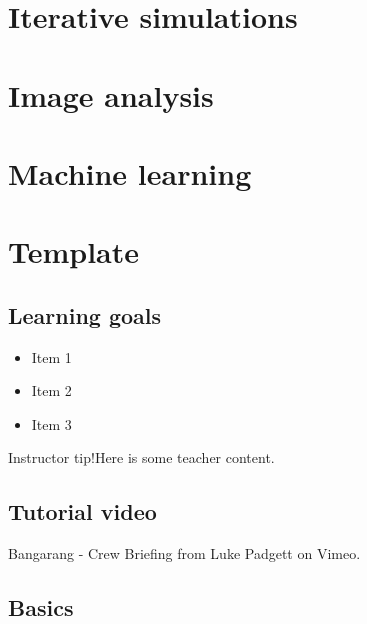 \documentclass[
]{book}
\providecommand{\tightlist}{%
  \setlength{\itemsep}{0pt}\setlength{\parskip}{0pt}}
\begin{document}
\hypertarget{iterative-simulations}{%
\chapter{Iterative simulations}\label{iterative-simulations}}

\hypertarget{image-analysis}{%
\chapter{Image analysis}\label{image-analysis}}

\hypertarget{machine-learning}{%
\chapter{Machine learning}\label{machine-learning}}

\hypertarget{template}{%
\chapter{Template}\label{template}}

\hypertarget{learning-goals-21}{%
\section*{Learning goals}\label{learning-goals-21}}

\begin{itemize}
\tightlist
\item
  Item 1\\
\item
  Item 2\\
\item
  Item 3
\end{itemize}

Instructor tip!Here is some teacher content.

\hypertarget{tutorial-video}{%
\section*{Tutorial video}\label{tutorial-video}}

Bangarang - Crew Briefing from Luke Padgett on Vimeo.

\hypertarget{basics-2}{%
\section*{Basics}\label{basics-2}}
\end{document}
